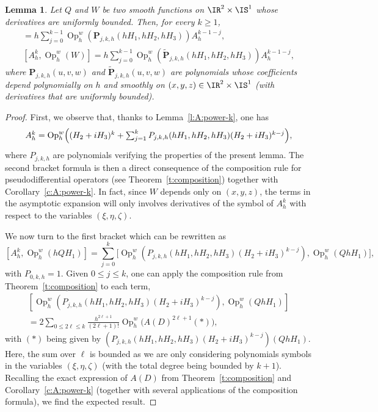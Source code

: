 \documentclass[10pt]{amsart}
\theoremstyle{plain}
\newtheorem{lemm}[theo]{Lemma}
\theoremstyle{definition}
\theoremstyle{remark}
\newcommand{\Op}{\operatorname{Op}}
\begin{document}
\begin{lemm}\label{l:commute-A-power-k} Let $Q$ and $W$ be two smooth functions on $\IR^2\times\IS^1$ whose derivatives are uniformly bounded. Then, for every $k\geq 1$,
\begin{align*}
[A_h^k,\Op_h^w(hQH_1)]=h\sum_{j=0}^{k-1}\Op_{h}^w(\boldsymbol{P}_{j,k,h}(hH_1,hH_2,hH_3))A_h^{k-1-j},
\\
\tag*{and}
[A_h^k,\Op_h^w(W)]=h\sum_{j=0}^{k-1}\Op_{h}^w(\tilde{\boldsymbol{P}}_{j,k,h}(hH_1,hH_2,hH_3))A_h^{k-1-j},
\end{align*}
where $\boldsymbol{P}_{j,k,h}(u,v,w)$ and $\tilde{\boldsymbol{P}}_{j,k,h}(u,v,w)$ are polynomials whose coefficients depend polynomially on $h$ and smoothly on $(x,y,z)\in \IR^2\times\IS^1$ (with derivatives that are uniformly bounded).
\end{lemm}

\begin{proof} First, we observe that, thanks to Lemma~\ref{l:A:power-k}, one has
\[\textstyle
A_h^k=\Op_h^w\Bigl((H_2+iH_3)^k+\sum_{j=1}^kP_{j,k,h}(hH_1,hH_2,hH_3)(H_2+iH_3)^{k-j}\Bigr),
\]
where $P_{j,k,h}$ are polynomials verifying the properties of the present lemma. The second bracket formula is then a direct consequence of the composition rule for pseudodifferential operators (see Theorem~\ref{t:composition}) together with Corollary~\ref{c:A:power-k}. In fact, since $W$ depends only on $(x,y,z)$, the terms in the asymptotic expansion will only involves derivatives of the symbol of $A_h^k$ with respect to the variables $(\xi,\eta,\zeta)$.

We now turn to the first bracket which can be rewritten as
\[
[A_h^k,\Op_h^w(hQH_1)]=\sum_{j=0}^k\bigl[\Op_h^w\left(P_{j,k,h}(hH_1,hH_2,hH_3)(H_2+iH_3)^{k-j}\right),\Op_h^w(QhH_1)\bigr],
\]
with $P_{0,k,h}=1$.
Given $0\leq j\leq k$, one can apply the composition rule from Theorem~\ref{t:composition} to each term, \ie
\begin{multline*}
\left[\Op_h^w\left(P_{j,k,h}(hH_1,hH_2,hH_3)(H_2+iH_3)^{k-j}\right),\Op_h^w(QhH_1)\right]\\
=2\sum_{0\leq 2\ell\leq k}\frac{h^{2\ell+1}}{(2\ell+1)!}\Op_h^w\bigl(A(D)^{2\ell+1}(*)\bigr),
\end{multline*}
with $(*)$ being given by $(P_{j,k,h}(hH_1,hH_2,hH_3)(H_2+iH_3)^{k-j})(QhH_1)$. Here, the sum over $\ell$ is bounded as we are only considering polynomials symbols in the variables $(\xi,\eta,\zeta)$ (with the total degree being bounded by $k+1$). Recalling the exact expression of $A(D)$ from Theorem~\ref{t:composition} and Corollary~\ref{c:A:power-k} (together with several applications of the composition formula), we find the expected result.
\end{proof}
\end{document}
